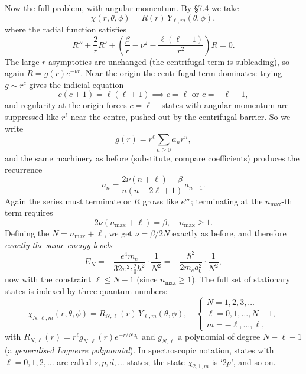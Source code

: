 Now the full problem, with angular momentum. By \S 7.4 we take
$$
\chi(r, \theta, \phi) = R(r) \, Y_{\ell, m}(\theta, \phi),
$$
where the radial function satisfies
$$
R'' + \frac{2}{r} R' + \left( \frac{\beta}{r} - \nu^2 - \frac{\ell(\ell+1)}{r^2} \right) R = 0.
$$
The large-$r$ asymptotics are unchanged (the centrifugal term is subleading), so again $R = g(r) e^{-\nu r}$. Near the origin the centrifugal term dominates: trying $g \sim r^c$ gives the indicial equation
$$
c(c + 1) = \ell(\ell+1) \implies c = \ell \text{ or } c = -\ell - 1,
$$
and regularity at the origin forces $c = \ell$ -- states with angular momentum are suppressed like $r^\ell$ near the centre, pushed out by the centrifugal barrier. So we write
$$
g(r) = r^\ell \sum_{n \geq 0} a_n r^n,
$$
and the same machinery as before (substitute, compare coefficients) produces the recurrence
$$
a_n = \frac{2\nu (n + \ell) - \beta}{n (n + 2\ell + 1)} \, a_{n-1}.
$$
Again the series must terminate or $R$ grows like $e^{\nu r}$; terminating at the $n_{\max}$-th term requires
$$
2 \nu (n_{\max} + \ell) = \beta, \quad n_{\max} \geq 1.
$$
Defining the  $N = n_{\max} + \ell$, we get $\nu = \beta/2N$ exactly as before, and therefore \emph{exactly the same energy levels}
$$
E_N = -\frac{e^4 m_e}{32 \pi^2 \epsilon_0^2 \hbar^2} \cdot \frac{1}{N^2} = -\frac{\hbar^2}{2 m_e a_0^2} \cdot \frac{1}{N^2},
$$
now with the constraint $\ell \leq N - 1$ (since $n_{\max} \geq 1$). The full set of stationary states is indexed by three quantum numbers:
$$
\chi_{N, \ell, m}(r, \theta, \phi) = R_{N, \ell}(r) \, Y_{\ell, m}(\theta, \phi), \quad
\begin{cases}
    N = 1, 2, 3, \dots \\
    \ell = 0, 1, \dots, N - 1, \\
    m = -\ell, \dots, \ell,
\end{cases}
$$
with $R_{N, \ell}(r) = r^\ell g_{N, \ell}(r) e^{-r/N a_0}$ and $g_{N, \ell}$ a polynomial of degree $N - \ell - 1$ (a \emph{generalised Laguerre polynomial}). In spectroscopic notation, states with $\ell = 0, 1, 2, \dots$ are called $s, p, d, \dots$ states; the state $\chi_{2,1,m}$ is `$2p$', and so on.

